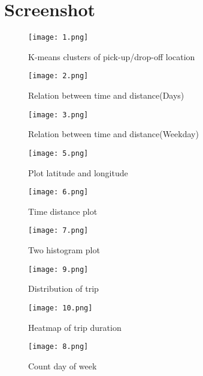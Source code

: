 \documentclass[12pt,report]{ucdavisthesis}
\begin{document}
  \section{Screenshot}
    
    \begin{figure}
    	\centering
    	\texttt{[image: 1.png]}
    	\caption{K-means clusters of pick-up/drop-off location}
    	\label{fig:gull}
    \end{figure}
    
  
   \begin{figure}
   	\centering
   	\texttt{[image: 2.png]}
   	\caption{Relation between time and distance(Days)}
   	\label{fig:gull}
   \end{figure}
     
    
     \begin{figure}
     	\centering
     	\texttt{[image: 3.png]}
     	\caption{Relation between time and distance(Weekday)}
     	\label{fig:gull}
     \end{figure}
     
   \begin{figure}
   	\centering
   	\texttt{[image: 5.png]}
   	\caption{Plot latitude and longitude}
   	\label{fig:gull}
   \end{figure}
     
    \begin{figure}
    	\centering
    	\texttt{[image: 6.png]}
    	\caption{Time distance plot}
    	\label{fig:gull}
    \end{figure}
     
     \begin{figure}
     	\centering
     	\texttt{[image: 7.png]}
     	\caption{Two histogram plot}
     	\label{fig:gull}
     \end{figure}
    
   \begin{figure}
   	\centering
   	\texttt{[image: 9.png]}
   	\caption{Distribution of trip }
   	\label{fig:gull}
   \end{figure}
   
    \begin{figure}
    	\centering
    	\texttt{[image: 10.png]}
    	\caption{Heatmap of trip duration}
    	\label{fig:gull}
    \end{figure}
   
     \begin{figure}
     	\centering
     	\texttt{[image: 8.png]}
     	\caption{Count day of week}
     	\label{fig:gull}
     \end{figure}
    
\end{document}
